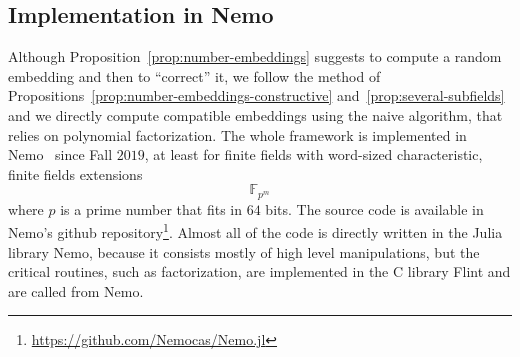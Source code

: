 \subsection{Implementation in Nemo}

Although Proposition~\ref{prop:number-embeddings} suggests to compute a random
embedding and then to ``correct'' it, we follow the method of
Propositions~\ref{prop:number-embeddings-constructive} and~\ref{prop:several-subfields} and
we directly compute compatible embeddings using the naive algorithm, that relies
on polynomial factorization. The whole framework is implemented in
Nemo~\cite{Nemo} since Fall $2019$, at least for finite fields with
word-sized characteristic, \ie finite fields extensions
\[
  \mathbb{F}_{p^m}
\]
where $p$ is a prime number that fits in $64$ bits. The source code is available
in Nemo's github repository\footnote{\url{https://github.com/Nemocas/Nemo.jl}}.
Almost all of the code is directly written in the Julia library Nemo, because it
consists mostly of high level manipulations, but the critical routines, such as
factorization, are implemented in the C library Flint and are called from Nemo.


